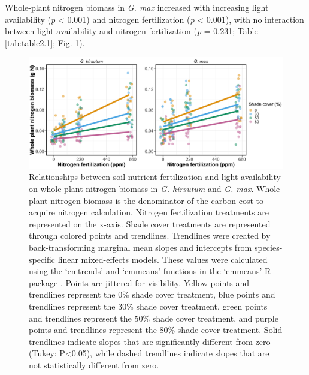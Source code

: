 Whole-plant nitrogen biomass in \textit{G. max} increased with increasing light availability (\textit{p} < 0.001) and nitrogen fertilization (\textit{p} < 0.001), with no interaction between light availability and nitrogen fertilization (\textit{p} = 0.231; Table \ref{tab:table2.1}; Fig. \ref{fig:figure2.2}).

\newpage
\begin{figure}
    \includegraphics[width=\textwidth]{ch2_LxN_Greenhouse/figs/fig2_nacq.png}
    \centering
    \caption[Relationships between soil nitrogen fertilization and light availability on whole-plant nitrogen biomass in \textit{G. hirsutum} and \textit{G. max}]{Relationships between soil nutrient fertilization and light availability on whole-plant nitrogen biomass in \textit{G. hirsutum} and \textit{G. max}. Whole-plant nitrogen biomass is the denominator of the carbon cost to acquire nitrogen calculation. Nitrogen fertilization treatments are represented on the x-axis. Shade cover treatments are represented through colored points and trendlines. Trendlines were created by back-transforming marginal mean slopes and intercepts from species-specific linear mixed-effects models. These values were calculated using the ‘emtrends’ and ‘emmeans’ functions in the ‘emmeans’ R package . Points are jittered for visibility. Yellow points and trendlines represent the 0\% shade cover treatment, blue points and trendlines represent the 30\% shade cover treatment, green points and trendlines represent the 50\% shade cover treatment, and purple points and trendlines represent the 80\% shade cover treatment. Solid trendlines indicate slopes that are significantly different from zero (Tukey: P<0.05), while dashed trendlines indicate slopes that are not statistically different from zero.}
    \label{fig:figure2.2}
    \small
\end{figure}
\clearpage

\newpage
